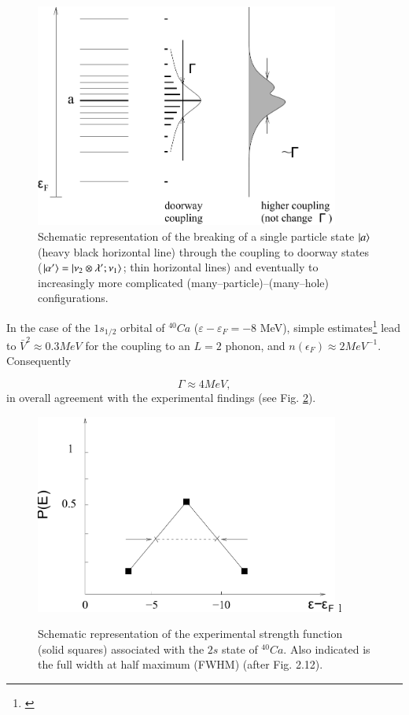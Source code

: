 \begin{figure}
\centerline {
\includegraphics*[width=10cm]{introduccion/figs/figintroD7}
}
\caption{Schematic representation of the breaking of a single particle state $|{a} \rangle$ (heavy black horizontal line) through the coupling to doorway states ($|{\alpha'} \rangle=|{\nu_2\otimes\lambda';\nu_1} \rangle$; thin horizontal lines) and eventually to increasingly more complicated (many--particle)--(many--hole) configurations.}
\label{fig:4.7}
\end{figure}

In the case of the $1s_{1/2}$ orbital of $^{40}Ca$ ($\varepsilon - \varepsilon_F = -8$ MeV), simple estimates\footnote{\cite{Mahaux:85}} lead to $\bar{V}^2 \approx 0.3 MeV$ for the coupling to an $L=2$ phonon, and $n(\epsilon_F) \approx 2MeV^{-1}$. Consequently

\begin{equation}
\Gamma \approx 4 MeV ,
\label{eqn:46}
\end{equation}
in overall agreement with the experimental findings (see Fig. \ref{fig:4.8}).
\begin{figure}[h!]
\centerline {
\includegraphics*[width=10cm]{introduccion/figs/figintroD8}
l}
\caption{Schematic representation of the experimental strength function (solid squares) associated with the $2s$ state of $^{40}Ca$. Also indicated is the full width at half maximum (FWHM) (after \cite{Mahaux:85} Fig. 2.12).}
\label{fig:4.8}
\end{figure}

